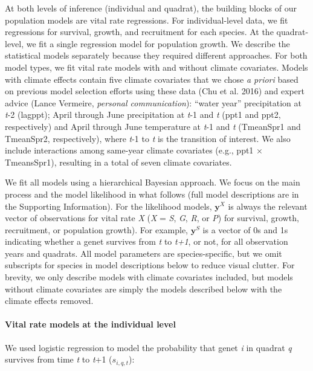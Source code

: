 \documentclass[12pt,]{article}
\begin{document}
At both levels of inference (individual and quadrat), the building
blocks of our population models are vital rate regressions. For
individual-level data, we fit regressions for survival, growth, and
recruitment for each species. At the quadrat-level, we fit a single
regression model for population growth. We describe the statistical
models separately because they required different approaches. For both
model types, we fit vital rate models with and without climate
covariates. Models with climate effects contain five climate covariates
that we chose \emph{a priori} based on previous model selection efforts
using these data (Chu et al. 2016) and expert advice (Lance Vermeire,
\emph{personal communication}): ``water year'' precipitation at
\emph{t}-2 (lagppt); April through June precipitation at \emph{t}-1 and
\emph{t} (ppt1 and ppt2, respectively) and April through June
temperature at \emph{t}-1 and \emph{t} (TmeanSpr1 and TmeanSpr2,
respectively), where \emph{t}-1 to \emph{t} is the transition of
interest. We also include interactions among same-year climate
covariates (e.g., ppt1 \(\times\) TmeansSpr1), resulting in a total of
seven climate covariates.

We fit all models using a hierarchical Bayesian approach. We focus on
the main process and the model likelihood in what follows (full model
descriptions are in the Supporting Information). For the likelihood
models, \(\textbf{y}^X\) is always the relevant vector of observations
for vital rate \emph{X} (\emph{X} = \emph{S}, \emph{G}, \emph{R}, or
\emph{P}) for survival, growth, recruitment, or population growth). For
example, \(\textbf{y}^S\) is a vector of 0s and 1s indicating whether a
genet survives from \emph{t} to \emph{t+1}, or not, for all observation
years and quadrats. All model parameters are species-specific, but we
omit subscripts for species in model descriptions below to reduce visual
clutter. For brevity, we only describe models with climate covariates
included, but models without climate covariates are simply the models
described below with the climate effects removed.

\paragraph{Vital rate models at the individual
level}\label{vital-rate-models-at-the-individual-level}

We used logistic regression to model the probability that genet \emph{i}
in quadrat \emph{q} survives from time \emph{t} to \emph{t}+1
(\(s_{i,q,t}\)):
\end{document}
